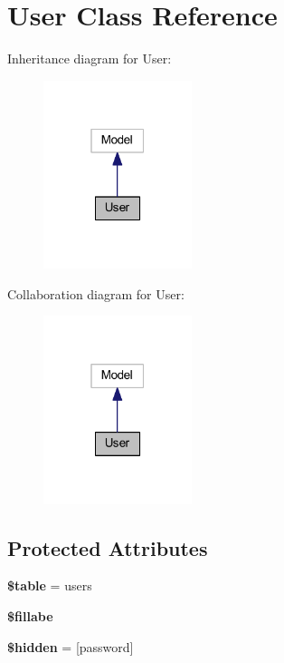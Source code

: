 \hypertarget{class_app_1_1_models_1_1_user}{}\section{User Class Reference}
\label{class_app_1_1_models_1_1_user}


Inheritance diagram for User\+:
\nopagebreak
\begin{figure}[H]
\begin{center}
\leavevmode
\includegraphics[width=123pt]{class_app_1_1_models_1_1_user__inherit__graph}
\end{center}
\end{figure}


Collaboration diagram for User\+:
\nopagebreak
\begin{figure}[H]
\begin{center}
\leavevmode
\includegraphics[width=123pt]{class_app_1_1_models_1_1_user__coll__graph}
\end{center}
\end{figure}
\subsection*{Protected Attributes}
\begin{DoxyCompactItemize}
\item 
\mbox{\label{class_app_1_1_models_1_1_user_ae8876a14058f368335baccf35af4a22b}} 
{\bfseries \$table} = \textquotesingle{}users\textquotesingle{}
\item 
{\bfseries \$fillabe}
\item 
\mbox{\label{class_app_1_1_models_1_1_user_a4a374564d2858d8ae869a8fb890aad56}} 
{\bfseries \$hidden} = \mbox{[}\textquotesingle{}password\textquotesingle{}\mbox{]}
\end{DoxyCompactItemize}


